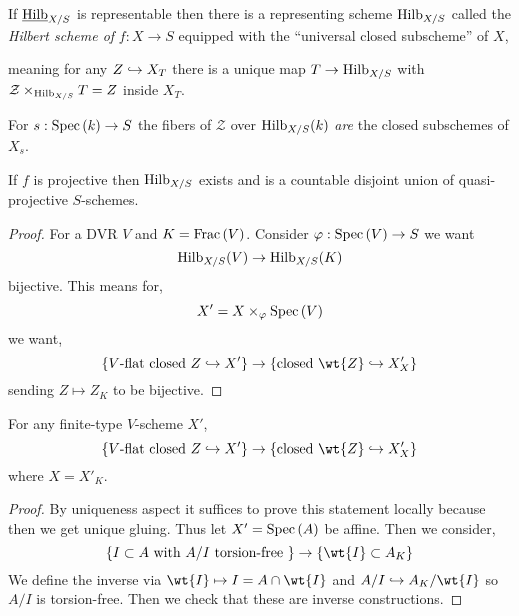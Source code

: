 \documentclass[12pt]{article}
\begin{document}
\begin{defn}
If $\underline{\mathrm{Hilb}}_{X/S}$ is representable then there is a representing scheme $\mathrm{Hilb}_{X/S}$ called the \textit{Hilbert scheme of } $f : X \to S$ equipped with the ``universal closed subscheme'' of $X$,
\begin{center}
\end{center}
meaning for any $Z \hookrightarrow X_T$ there is a unique map $T \to \mathrm{Hilb}_{X/S}$ with $\mathcal{Z} \times_{\mathrm{Hilb}_{X/S}} T = Z$ inside $X_T$.
\end{defn}

\begin{rmk}
For $s : \mathrm{Spec}\left( k \right) \to S$ the fibers of $\mathcal{Z}$ over $\mathrm{Hilb}_{X/S}(k)$ \textit{are} the closed subschemes of $X_s$.
\end{rmk}

\begin{thm}[G]
If $f$ is projective then $\mathrm{Hilb}_{X/S}$ exists and is a countable disjoint union of quasi-projective $S$-schemes.
\end{thm}

\begin{proof}
For a DVR $V$ and $K = \mathrm{Frac}\left(V\right)$. Consider $\varphi : \mathrm{Spec}\left( V \right) \to S$ we want 
\[ \mathrm{Hilb}_{X/S}(V) \to \mathrm{Hilb}_{X/S}(K) \]
bijective. This means for,
\[ X' = X \times_{\varphi} \mathrm{Spec}\left( V \right) \]
we want,
\[ \{ V\text{-flat closed } Z \embed X' \} \to \{ \text{closed } \wt{Z} \embed X'_X \} \]
sending $Z \mapsto Z_K$ to be bijective.
\end{proof}

\begin{lemma}
For any finite-type $V$-scheme $X'$,
\[ \{ V\text{-flat closed } Z \embed X' \} \to \{ \text{closed } \wt{Z} \embed X'_X \} \]
where $X = X'_K$.
\end{lemma}

\begin{proof}
By uniqueness aspect it suffices to prove this statement locally because then we get unique gluing. Thus let $X' = \mathrm{Spec}\left( A \right)$ be affine. Then we consider,
\[ \{ I \subset A \text{ with } A / I \text{ torsion-free } \} \to \{ \wt{I} \subset A_K \} \]
We define the inverse via $\wt{I} \mapsto I = A \cap \wt{I}$ and $A/I \embed A_K/\wt{I}$ so $A/I$ is torsion-free. Then we check that these are inverse constructions.
\end{proof}
\end{document}
